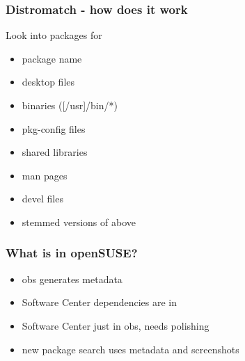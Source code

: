 \documentclass{beamer}
\begin{document}
\begin{frame}[t]
\frametitle{Distromatch - how does it work}
Look into packages for
\begin{itemize}
\item package name
\item desktop files
\item binaries ([/usr]/bin/*)
\item pkg-config files
\item shared libraries
\item man pages
\item devel files
\item stemmed versions of above
\end{itemize}
\end{frame}

\begin{frame}[t]
\frametitle{What is in openSUSE?}
\begin{itemize}
\item obs generates metadata
\item Software Center dependencies are in
\item Software Center just in obs, needs polishing
\item new package search uses metadata and screenshots
\end{itemize}
\end{frame}

\end{document}
